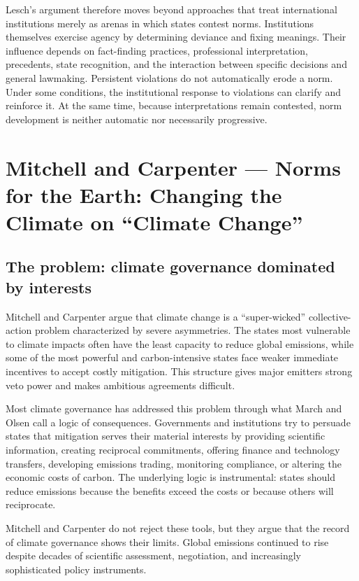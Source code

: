 Lesch's argument therefore moves beyond approaches that treat international institutions merely as arenas in which states contest norms. Institutions themselves exercise agency by determining deviance and fixing meanings. Their influence depends on fact-finding practices, professional interpretation, precedents, state recognition, and the interaction between specific decisions and general lawmaking. Persistent violations do not automatically erode a norm. Under some conditions, the institutional response to violations can clarify and reinforce it. At the same time, because interpretations remain contested, norm development is neither automatic nor necessarily progressive.

\clearpage
\section{Mitchell and Carpenter --- Norms for the Earth: Changing the Climate on ``Climate Change''}

\subsection{The problem: climate governance dominated by interests}

Mitchell and Carpenter argue that climate change is a ``super-wicked'' collective-action problem characterized by severe asymmetries. The states most vulnerable to climate impacts often have the least capacity to reduce global emissions, while some of the most powerful and carbon-intensive states face weaker immediate incentives to accept costly mitigation. This structure gives major emitters strong veto power and makes ambitious agreements difficult.

Most climate governance has addressed this problem through what March and Olsen call a logic of consequences. Governments and institutions try to persuade states that mitigation serves their material interests by providing scientific information, creating reciprocal commitments, offering finance and technology transfers, developing emissions trading, monitoring compliance, or altering the economic costs of carbon. The underlying logic is instrumental: states should reduce emissions because the benefits exceed the costs or because others will reciprocate.

Mitchell and Carpenter do not reject these tools, but they argue that the record of climate governance shows their limits. Global emissions continued to rise despite decades of scientific assessment, negotiation, and increasingly sophisticated policy instruments.

